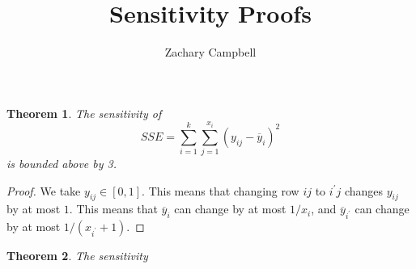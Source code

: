 \documentclass[11pt]{article}
\newtheorem{theorem}{Theorem}
\begin{document}
\title{Sensitivity Proofs}
\author{Zachary Campbell}

\maketitle

\begin{theorem}{}
	The sensitivity of 
	\[
		SSE = \sum_{i=1}^{k} \sum_{j=1}^{x_i} (y_{ij} - \overline{y}_i) ^ 2
	\]
	is bounded above by 3.
\end{theorem}

\begin{proof}{}
	We take $y_{ij}\in [0,1]$. This means that changing row $ij$ to $i^{'}j$ changes $y_{ij}$ 
	by at most $1$. This means that $\overline{y}_i$ can change by at most $1/x_i$, and 
	$\overline{y}_{i^{'}}$ can change by at most $1/(x_{i^{'}} + 1)$.
\end{proof}

\begin{theorem}{}
	The sensitivity
\end{theorem}
\end{document}
